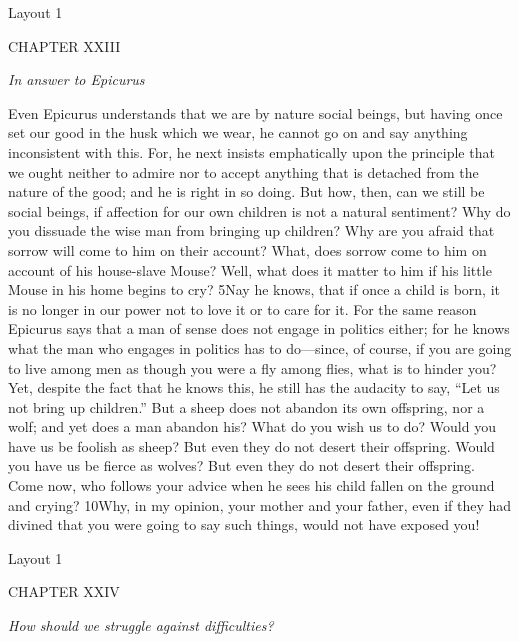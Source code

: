 

Layout 1

CHAPTER XXIII

\emph{In answer to Epicurus}

Even Epicurus understands that we are by nature social beings, but having once set our good in the husk which we wear, he cannot go on and say anything inconsistent with this. For, he next insists emphatically upon the principle that we ought neither to admire nor to accept anything that is detached from the nature of the good; and he is right in so doing. But how, then, can we still be social beings, if affection for our own children is not a natural sentiment? Why do you dissuade the wise man from bringing up children? Why are you afraid that sorrow will come to him on their account? What, does sorrow come to him on account of his house-slave Mouse? Well, what does it matter to him if his little Mouse in his home begins to cry? 5Nay he knows, that if once a child is born, it is no longer in our power not to love it or to care for it. For the same reason Epicurus says that a man of sense does not engage in politics either; for he knows what the man who engages in politics has to do—since, of course, if you are going to live among men as though you were a fly among flies, what is to hinder you? Yet, despite the fact that he knows this, he still has the audacity to say, ``Let us not bring up children.'' But a sheep does not abandon its own offspring, nor a wolf; and yet does a man abandon his? What do you wish us to do? Would you have us be foolish as sheep? But even they do not desert their offspring. Would you have us be fierce as wolves? But even they do not desert their offspring. Come now, who follows your advice when he sees his child fallen on the ground and crying? 10Why, in my opinion, your mother and your father, even if they had divined that you were going to say such things, would not have exposed you!



Layout 1

CHAPTER XXIV

\emph{How should we struggle against difficulties?}

